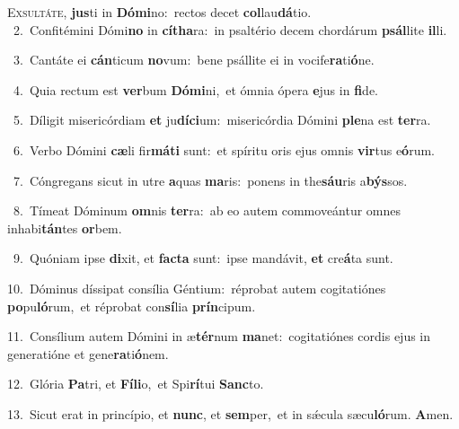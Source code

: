 \lettrine{\initial\textcolor{\initialcolor}{E}}{xsultáte,} \textbf{jus}\-ti in \textbf{Dó}\-\textbf{mi}no:~\star rectos decet \textbf{col}\-lau\-\textbf{dá}\-tio.\\
{\numbfont\textcolor{\numbcolor}{~2.}}~Confitémini Dómi\textbf{no} in \textbf{cí}\-\textbf{tha}ra:~\star in psaltério decem chordárum \textbf{psál}\-lite \textbf{il}\-li.\par
{\numbfont\textcolor{\numbcolor}{~3.}}~Cantáte ei \textbf{cán}\-ticum \textbf{no}\-vum:~\star bene psállite ei in vocife\-\textbf{ra}\-ti\-\textbf{ó}\-ne.\par
{\numbfont\textcolor{\numbcolor}{~4.}}~Quia rectum est \textbf{ver}\-bum \textbf{Dó}\-\textbf{mi}ni,~\star et ómnia ópera \textbf{e}\-jus in \textbf{fi}\-de.\par
{\numbfont\textcolor{\numbcolor}{~5.}}~Díligit misericórdiam \textbf{et} ju\-\textbf{dí}\-\textbf{ci}um:~\star misericórdia Dómini \textbf{ple}\-na est \textbf{ter}\-ra.\par
{\numbfont\textcolor{\numbcolor}{~6.}}~Verbo Dómini \textbf{cæ}\-li fir\-\textbf{má}\-\textbf{ti} sunt:~\star et spíritu oris ejus omnis \textbf{vir}\-tus e\-\textbf{ó}\-rum.\par
{\numbfont\textcolor{\numbcolor}{~7.}}~Cóngregans sicut in utre \textbf{a}\-quas \textbf{ma}\-ris:~\star ponens in the\-\textbf{sáu}\-ris a\-\textbf{býs}\-sos.\par
{\numbfont\textcolor{\numbcolor}{~8.}}~Tímeat Dóminum \textbf{om}\-nis \textbf{ter}\-ra:~\star ab eo autem commoveántur omnes inhabi\-\textbf{tán}\-tes \textbf{or}\-bem.\par
{\numbfont\textcolor{\numbcolor}{~9.}}~Quóniam ipse \textbf{di}\-xit, et \textbf{fac}\-\textbf{ta} sunt:~\star ipse mandávit, \textbf{et} cre\-\textbf{á}\-ta sunt.\par
{\numbfont\textcolor{\numbcolor}{10.}}~Dóminus díssipat consília Géntium:~\dagger réprobat autem cogitatiónes \textbf{po}\-pu\-\textbf{ló}\-rum,~\star et réprobat con\-\textbf{sí}\-lia \textbf{prín}\-cipum.\par
{\numbfont\textcolor{\numbcolor}{11.}}~Consílium autem Dómini in æ\-\textbf{tér}\-num \textbf{ma}\-net:~\star cogitatiónes cordis ejus in generatióne et gene\-\textbf{ra}\-ti\-\textbf{ó}\-nem.\par
{\numbfont\textcolor{\numbcolor}{12.}}~Glória \textbf{Pa}\-tri, et \textbf{Fí}\-\textbf{li}o,~\star et Spi\-\textbf{rí}\-tui \textbf{Sanc}\-to.\par
{\numbfont\textcolor{\numbcolor}{13.}}~Sicut erat in princípio, et \textbf{nunc}\-, et \textbf{sem}\-per,~\star et in sǽcula sæcu\-\textbf{ló}\-rum. \textbf{A}\-men.\par

